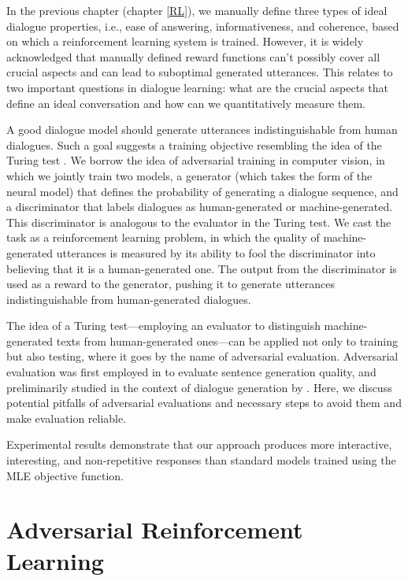In the previous chapter (chapter \ref{RL}), we manually define three types of ideal dialogue properties, i.e., ease of answering, informativeness, and coherence, 
based on which a reinforcement learning system is trained. 
However, 
it is widely
acknowledged that  
manually defined reward functions can't possibly
cover all crucial aspects and can lead to suboptimal generated utterances. 
This relates to two important questions in dialogue learning:  
what are the crucial
aspects that define an ideal conversation and how
can we quantitatively measure them.

A good dialogue model should generate utterances indistinguishable from human dialogues.
Such a goal suggests a training objective 
resembling the idea of the Turing test \cite{turing1950computing}.
We borrow the idea of adversarial training \cite{goodfellow2014generative,denton2015deep} in 
computer
vision, in which we jointly train two models, 
a generator (which takes the form of the neural  \sts model) that defines the probability of generating a dialogue sequence, and 
a discriminator
that labels dialogues as human-generated or machine-generated. 
This discriminator  is analogous to  the evaluator in the Turing test.
We cast the task as a reinforcement learning problem, in which the quality of machine-generated utterances is measured by its ability to fool the discriminator into believing that it is a human-generated one. The output from the discriminator is used as a reward to the generator, pushing it to generate 
utterances indistinguishable from human-generated dialogues. 

The idea of a Turing test---employing an evaluator 
to distinguish  machine-generated texts from human-generated
ones---can be applied not only to training but also testing,
where it goes by the name of adversarial evaluation. Adversarial
evaluation was first employed in  to evaluate sentence generation quality, and preliminarily studied in the context of dialogue generation by . 
Here, we discuss potential pitfalls of adversarial evaluations and 
  necessary steps to avoid them and make evaluation reliable. 



Experimental results demonstrate that our approach
produces more interactive, interesting, and non-repetitive responses than standard
\sts models trained using the MLE objective function.
\section{Adversarial Reinforcement Learning}

